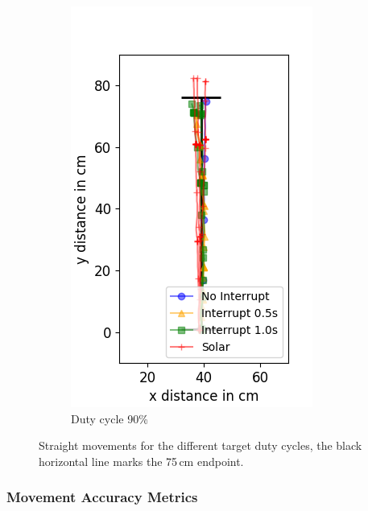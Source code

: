 \begin{figure}
\begin{subfigure}[b]{0.32\textwidth}
		\includegraphics[width=\textwidth]{pics/straight_90.png}
		\caption{Duty cycle 90\%}
		\label{fig:stra_exp3}
	\end{subfigure}
	\caption{Straight movements for the different target duty cycles, the black horizontal line marks the 75\,cm endpoint.}
	\label{fig:straight_movements}
\end{figure}

\subsubsection{Movement Accuracy Metrics}

